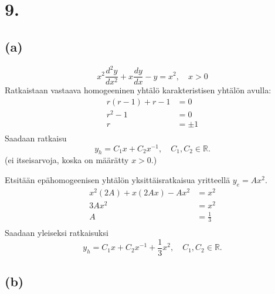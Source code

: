 \documentclass{article}
\begin{document}
\section*{9.}

\subsection*{(a)}

\[
  x^2\frac{d^2 y}{d x^2} + x\frac{dy}{dx} - y = x^2, \quad x > 0
\]
Ratkaistaan vastaava homogeeninen yhtälö karakteristisen yhtälön avulla:
\begin{align*}
  r(r-1) + r - 1 &= 0 \\
  r^2 - 1 &= 0 \\
  r &= \pm 1 \\
\end{align*}
Saadaan ratkaisu
\[
  y_h = C_1x + C_2x^{-1}, \quad C_1,C_2 \in \mathbb{R}.
\]
(ei itseisarvoja, koska on määrätty $x > 0$.)

Etsitään epähomogeenisen yhtälön yksittäisratkaisua yritteellä $y_e = Ax^2$.
\begin{align*}
  x^2(2A) + x(2Ax) - Ax^2 &= x^2 \\
  3Ax^2 &= x^2 \\
  A &= \frac{1}{3} \\
\end{align*}
Saadaan yleiseksi ratkaisuksi
\[
  y_h = C_1x + C_2x^{-1} + \frac{1}{3}x^2, \quad C_1,C_2 \in \mathbb{R}.
\]

\subsection*{(b)}
\end{document}
